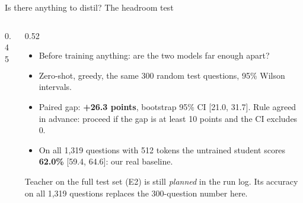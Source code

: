 \begin{frame}{Is there anything to distil? The headroom test\hfill\ours\ }
  \begin{columns}[c]
    \begin{column}{0.45\textwidth}
      \centering
    \end{column}
    \begin{column}{0.52\textwidth}
      \small
      \begin{itemize}
        \item Before training anything: are the two models far enough apart?
        \item Zero-shot, greedy, the same 300 random test questions,
              95\% Wilson intervals.
        \item Paired gap: \textbf{+26.3 points}, bootstrap 95\% CI
              [21.0, 31.7]. Rule agreed in advance: proceed if the gap is at
              least 10 points and the CI excludes 0.
        \item On all 1,319 questions with 512 tokens the untrained student
              scores \textbf{62.0\%} [59.4, 64.6]: our real baseline.
      \end{itemize}
      \begin{todobox}{Teacher on the full test set (E2)}
         is still \emph{planned} in the run log. Its accuracy
        on all 1,319 questions replaces the 300-question number here.
      \end{todobox}
    \end{column}
  \end{columns}
\end{frame}

